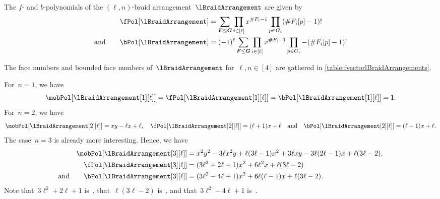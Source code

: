 \begin{corollary}
The $f$- and $b$-polynomials of the $(\ell,n)$-braid arrangement~$\lBraidArrangement$ are given by
\begin{align*}
\fPol[\lBraidArrangement] & = \sum_{\b{F} \le \b{G}} \prod_{i \in [\ell]} x^{\#F_i-1} \prod_{p \in G_i} (\# F_i[p]-1)!\\
\text{and}\qquad
\bPol[\lBraidArrangement] & = (-1)^\ell \sum_{\b{F} \le \b{G}} \prod_{i \in [\ell]} x^{\#F_i-1} \prod_{p \in G_i} -(\# F_i[p]-1)!
\end{align*}
\end{corollary}

The face numbers and bounded face numbers of~$\lBraidArrangement$ for~$\ell, n \in [4]$ are gathered in \cref{table:fvectorlBraidArrangements}.

\begin{example}[$n \le 3$]
For~$n = 1$, we have
\[
\mobPol[{\lBraidArrangement[1][\ell]}] = \fPol[{\lBraidArrangement[1][\ell]}] = \bPol[{\lBraidArrangement[1][\ell]}] = 1.
\]
For~$n = 2$, we have
\[
\mobPol[{\lBraidArrangement[2][\ell]}] = xy-\ell x+\ell,
\quad
\fPol[{\lBraidArrangement[2][\ell]}] = (\ell+1)x+\ell
\quad\text{and}\quad
\bPol[{\lBraidArrangement[2][\ell]}] = (\ell-1)x+\ell.
\]
The case~$n = 3$ is already more interesting.
Hence, we have
\begin{align*}
\mobPol[{\lBraidArrangement[3][\ell]}] & = x^2 y^2 - 3 \ell x^2 y + \ell (3 \ell - 1) x^2 + 3 \ell x y - 3 \ell (2 \ell - 1) x + \ell (3 \ell - 2) , \\
\fPol[{\lBraidArrangement[3][\ell]}] & = (3 \ell^2 + 2 \ell + 1) x^2 + 6 \ell^2 x + \ell (3 \ell - 2) \\
\text{and}\qquad
\bPol[{\lBraidArrangement[3][\ell]}] & = (3 \ell^2 - 4 \ell + 1) x^2 + 6 \ell (\ell - 1) x + \ell (3 \ell - 2).
\end{align*}
Note that~$3 \ell^2 + 2 \ell + 1$ is~, that~$\ell (3 \ell - 2)$ is~, and that~$3 \ell^2 - 4 \ell + 1$ is~.
\end{example}

\begin{theorem}
\end{theorem}

